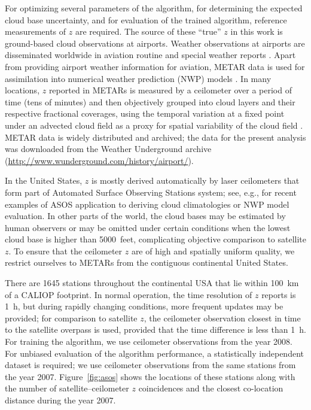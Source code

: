 \documentclass[essd,manuscript]{copernicus}\usepackage[]{graphicx}\usepackage[]{color}
\newcommand\CBH{\ensuremath{z}}
\begin{document}
For optimizing several parameters of the algorithm, for determining the expected
cloud base uncertainty, and for evaluation of the trained algorithm, reference
measurements of \CBH{} are required.  The source of these ``true'' \CBH{} in this work
is ground-based cloud observations at airports.  Weather observations at
airports are disseminated worldwide in aviation routine and special weather
reports \citep[METARs and SPECIs, collectively referred to as METARs
henceforth,][]{metar}.  Apart from providing airport weather information for
aviation, METAR data is used for assimilation into numerical weather prediction
(NWP) models \citep[e.g.,][]{Benjamin2016, Dee2011}.  In many locations, \CBH{}
reported in METARs is measured by a ceilometer over a period of time (tens of
minutes) and then objectively grouped into cloud layers and their respective
fractional coverages, using the temporal variation at a fixed point under an
advected cloud field as a proxy for spatial variability of the cloud field
\citep[e.g.,][]{Heese2010}.  METAR data is widely distributed and archived; the
data for the present analysis was downloaded from the Weather Underground
archive (\url{http://www.wunderground.com/history/airport/}).

In the United States, \CBH{} is mostly derived automatically by laser ceilometers
that form part of Automated Surface Observing Stations \citep[ASOS,][]{asos}
system; see, e.g., \cite{An2017,Ikeda2017} for recent examples of ASOS
application to deriving cloud climatologies or NWP model evaluation.  In other
parts of the world, the cloud bases may be estimated by human observers or may
be omitted under certain conditions when the lowest cloud base is higher than
5000~feet, complicating objective comparison to satellite \CBH{}.  To ensure that
the ceilometer \CBH{} are of high and spatially uniform quality, we restrict
ourselves to METARs from the contiguous continental United States.

There are 1645 %
stations throughout the continental USA that lie within 100~km of a CALIOP
footprint.  In normal operation, the time resolution of \CBH{} reports is 1~h, but
during rapidly changing conditions, more frequent updates may be provided; for
comparison to satellite \CBH{}, the ceilometer observation closest in time to the
satellite overpass is used, provided that the time difference is less than 1~h.
For training the algorithm, we use ceilometer observations from the year 2008.
For unbiased evaluation of the algorithm performance, a statistically
independent dataset is required; we use ceilometer observations from the same
stations from the year 2007.  Figure~\ref{fig:asos} shows the locations of these
stations along with the number of satellite--ceilometer \CBH{} coincidences and the
closest co-location distance during the year 2007.
\end{document}
